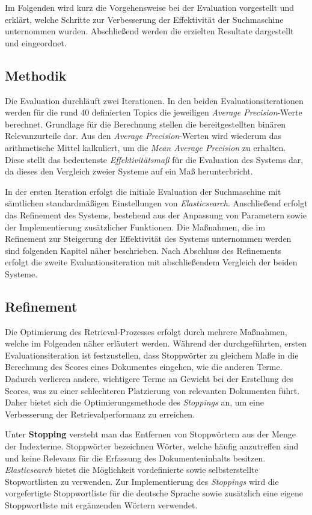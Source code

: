\documentclass[11pt,a4paper, halfparskip]{scrartcl}
\begin{document}
Im Folgenden wird kurz die Vorgehensweise bei der Evaluation vorgestellt und erklärt, welche Schritte zur Verbesserung der Effektivität der Suchmaschine unternommen wurden.
Abschließend werden die erzielten Resultate dargestellt und eingeordnet.

\subsection{Methodik}

Die Evaluation durchläuft zwei Iterationen.
In den beiden Evaluationsiterationen werden für die rund 40 definierten Topics die jeweiligen \textit{Average Precision}-Werte berechnet. 
Grundlage für die Berechnung stellen die bereitgestellten binären Relevanzurteile dar.
Aus den \textit{Average Precision}-Werten wird wiederum das arithmetische Mittel kalkuliert, um die \textit{Mean Average Precision} zu erhalten.
Diese stellt das bedeutenste \textit{Effektivitätsmaß} für die Evaluation des Systems dar, da dieses den Vergleich zweier Systeme auf ein Maß herunterbricht.

In der ersten Iteration erfolgt die initiale Evaluation der Suchmaschine mit sämtlichen standardmäßigen Einstellungen von \textit{Elasticsearch}.
Anschließend erfolgt das Refinement des Systems, bestehend aus der Anpassung von Parametern sowie der Implementierung zusätzlicher Funktionen. 
Die Maßnahmen, die im Refinement zur Steigerung der Effektivität des Systems unternommen werden sind folgenden Kapitel näher beschrieben. 
Nach Abschluss des Refinements erfolgt die zweite Evaluationsiteration mit abschließendem Vergleich der beiden Systeme. 

\subsection{Refinement}

Die Optimierung des Retrieval-Prozesses erfolgt durch mehrere Maßnahmen, welche im Folgenden näher erläutert werden.
Während der durchgeführten, ersten Evaluationsiteration ist festzustellen, dass Stoppwörter zu gleichem Maße in die Berechnung des Scores eines Dokumentes eingehen, wie die anderen Terme.
Dadurch verlieren andere, wichtigere Terme an Gewicht bei der Erstellung des Scores, was zu einer schlechteren Platzierung von relevanten Dokumenten führt.
Daher bietet sich die Optimierungsmethode des \textit{Stoppings} an, um eine Verbesserung der Retrievalperformanz zu erreichen.

Unter \textbf{Stopping} versteht man das Entfernen von Stoppwörtern aus der Menge der Indexterme.
Stoppwörter bezeichnen Wörter, welche häufig anzutreffen sind und keine Relevanz für die Erfassung des Dokumenteninhalts besitzen.
\textit{Elasticsearch} bietet die Möglichkeit vordefinierte sowie selbsterstellte Stopwortlisten zu verwenden.
Zur Implementierung des \textit{Stoppings} wird die vorgefertigte Stoppwortliste für die deutsche Sprache sowie zusätzlich eine eigene Stoppwortliste mit ergänzenden Wörtern verwendet. 
\end{document}
